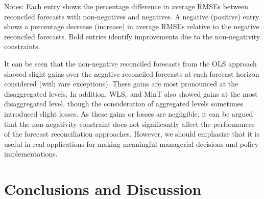 \documentclass[11pt]{article}
\newcommand{\0}{\phantom{0}}
\begin{document}
\begin{table}[p]
\begin{threeparttable}
\begin{tabular}{lrrrrrrrrrrr}
			\bottomrule
		\end{tabular}
		\begin{tablenotes}
			\item [] Notes: Each entry shows the percentage difference in average RMSEs between reconciled forecasts with non-negatives and negatives. A negative (positive) entry shows a percentage decrease (increase) in average RMSEs relative to the negative reconciled forecasts. Bold entries identify improvements due to the non-negativity constraints.
		\end{tablenotes}
	\end{threeparttable}
\end{table}

It can be seen that the non-negative reconciled forecasts from the OLS approach showed slight gains over the negative reconciled forecasts at each forecast horizon considered (with rare exceptions). These gains are most pronounced at the disaggregated levels. In addition, WLS$_{v}$ and MinT also showed gains at the most disaggregated level, though the consideration of aggregated levels sometimes introduced slight losses. As these gains or losses are negligible, it can be argued that the non-negativity constraint does not significantly affect the performances of the forecast reconciliation approaches. However, we should emphasize that it is useful in real applications for making meaningful managerial decisions and policy implementations.

\section{Conclusions and Discussion}
\end{document}
